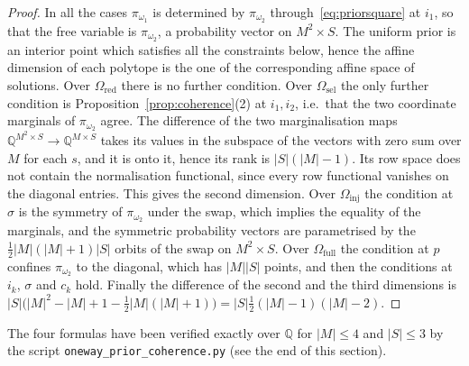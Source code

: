 \documentclass[11pt,a4paper]{article}
\theoremstyle{plain}
\theoremstyle{definition}
\theoremstyle{remark}
\newcommand{\cat}[1]{\mathsf{#1}}
\newcommand{\catO}{\cat{\Omega}}
\begin{document}
\begin{proof}
In all the cases $\pi_{\omega_1}$ is determined by $\pi_{\omega_2}$
through~\eqref{eq:priorsquare} at $i_1$, so that the free variable is
$\pi_{\omega_2}$, a probability vector on $M^{2}\times S$. The uniform prior is
an interior point which satisfies all the constraints below, hence the affine
dimension of each polytope is the one of the corresponding affine space of
solutions. Over $\catO_{\mathrm{red}}$ there is no further condition. Over
$\catO_{\mathrm{sel}}$ the only further condition is
Proposition~\ref{prop:coherence}(2) at $i_1,i_2$, i.e.\ that the two coordinate
marginals of $\pi_{\omega_2}$ agree. The difference of the two marginalisation
maps $\mathbb{Q}^{M^{2}\times S} \to \mathbb{Q}^{M\times S}$ takes its values
in the subspace of the vectors with zero sum over $M$ for each $s$, and it is
onto it, hence its rank is $|S|(|M|-1)$. Its row space does not contain the
normalisation functional, since every row functional vanishes on the diagonal
entries. This gives the second dimension. Over $\catO_{\mathrm{inj}}$ the
condition at $\sigma$ is the symmetry of $\pi_{\omega_2}$ under the swap,
which implies the equality of the marginals, and the symmetric probability
vectors are parametrised by the $\tfrac12|M|(|M|+1)|S|$ orbits of the swap on
$M^{2}\times S$. Over $\catO_{\mathrm{full}}$ the condition at $p$ confines
$\pi_{\omega_2}$ to the diagonal, which has $|M||S|$ points, and then the
conditions at $i_k$, $\sigma$ and $c_k$ hold. Finally the difference of the
second and the third dimensions is
$|S|\bigl(|M|^{2}-|M|+1-\tfrac12|M|(|M|+1)\bigr) =
|S|\tfrac12(|M|-1)(|M|-2)$.
\end{proof}

The four formulas have been verified exactly over $\mathbb{Q}$ for $|M|\le 4$
and $|S|\le 3$ by the script
\texttt{oneway\_\allowbreak prior\_\allowbreak coherence.py} (see the end of
this section).
\end{document}
